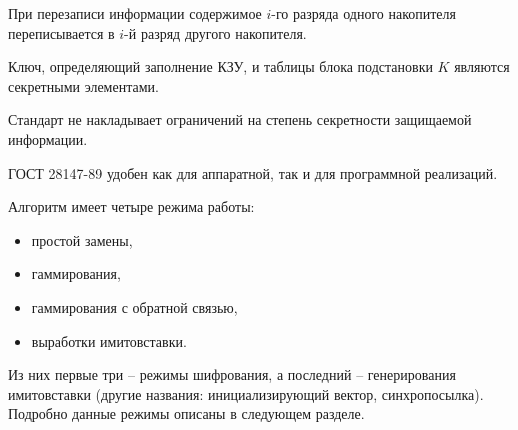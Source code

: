 При перезаписи информации содержимое $i$-го разряда одного накопителя переписывается в $i$-й разряд другого накопителя.

Ключ, определяющий заполнение КЗУ, и таблицы блока подстановки $K$ являются секретными элементами.

Стандарт не накладывает ограничений на степень секретности защищаемой информации.

ГОСТ 28147-89 удобен как для аппаратной, так и для программной реализаций.

Алгоритм имеет четыре режима работы:
\begin{itemize}
    \item простой замены,
    \item гаммирования,
    \item гаммирования с обратной связью,
    \item выработки имитовставки.
\end{itemize}

Из них первые три -- режимы шифрования, а последний -- генерирования имитовставки (другие названия: инициализирующий вектор, синхропосылка). Подробно данные режимы описаны в следующем разделе.

